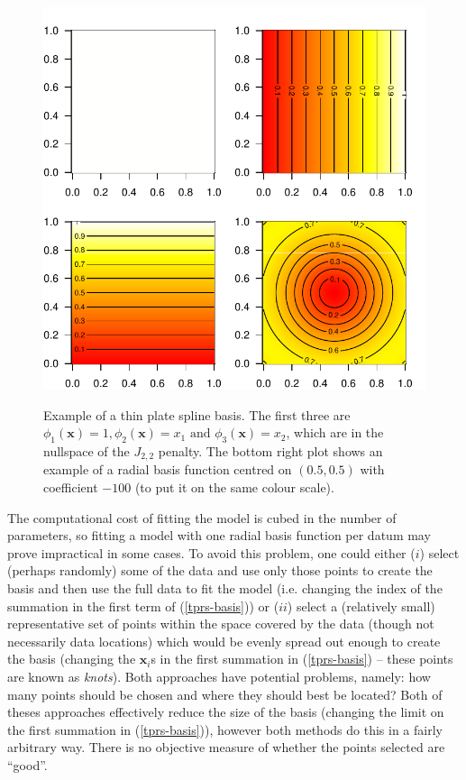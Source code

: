 \begin{figure}[p]
\centering
\includegraphics[width=\textwidth]{intro/figs/tprsex.pdf}\\
\caption{Example of a thin plate spline basis. The first three are $\phi_1(\mathbf{x})=1, \phi_2(\mathbf{x})=x_1 \text{ and } \phi_3(\mathbf{x})=x_2$, which are in the nullspace of the $J_{2,2}$ penalty. The bottom right plot shows an example of a radial basis function centred on $(0.5,0.5)$ with coefficient $-100$ (to put it on the same colour scale).}
\label{tprs-basis-fig}
\end{figure}

The computational cost of fitting the model is cubed in the number of parameters, so fitting a model with one radial basis function per datum may prove impractical in some cases. To avoid this problem, one could either ($i$) select (perhaps randomly) some of the data and use only those points to create the basis and then use the full data to fit the model (i.e. changing the index of the summation in the first term of (\ref{tprs-basis})) or ($ii$) select a (relatively small) representative set of points within the space covered by the data (though not necessarily data locations) which would be evenly spread out enough to create the basis (changing the $\mathbf{x}_i$s in the first summation in (\ref{tprs-basis}) -- these points are known as \textit{knots}). Both approaches have potential problems, namely: how many points should be chosen and where they should best be located? Both of theses approaches effectively reduce the size of the basis (changing the limit on the first summation in (\ref{tprs-basis})), however both methods do this in a fairly arbitrary way. There is no objective measure of whether the points selected are ``good''. 

